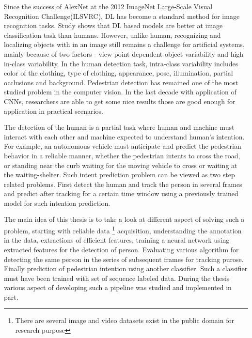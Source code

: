 \newpara Since the success of AlexNet at the 2012 ImageNet Large-Scale Visual Recognition Challenge(ILSVRC), DL has become a standard method for image recognition tasks. Study shows that DL based models are better at image classification task than humans. However, unlike human, recognizing and localizing objects with in an image still remains a challenge for artificial 
systems, mainly because of two factors - view point dependent object variability and
high in-class variability. In the human detection task, intra-class variability includes
color of the clothing, type of clothing, appearance, pose, illumination, partial occlusions
and background. Pedestrian detection has remained one of  the most studied problem in the computer vision.
In the last decade with application of CNNs, researchers are able to get some nice results 
those are good enough for application in practical scenarios.

\newpara The detection of the human is a partial task where human and machine must interact 
with each other and machine expected to understand human's intention. For example, 
an autonomous vehicle must anticipate and predict the pedestrian behavior in a reliable manner, whether 
the pedestrian intents to cross the road, or standing near the curb waiting for the moving vehicle to cross or waiting at the waiting-shelter.
Such intent prediction problem can be viewed as two step related problems. First detect the 
human and track the person in several frames and predict after tracking for a certain time window using a previously trained model for such intention prediction.

\newpara The main idea of this thesis is to take a look at different aspect of solving such a problem, 
starting with reliable data \footnote{There are several image and video datasets exist in the 
public domain for research purpose} acquisition, understanding the annotation in the data, extractions of efficient features, training a neural network using extracted features for the detection of person. Evaluating various algorithm for detecting the same person in the series of subsequent frames for tracking purose. Finally prediction of pedestrian intention using another classifier. Such a classifier must have been trained with set of sequence labeled data. During the thesis various aspect of developing such a pipeline was studied and implemented in part.

